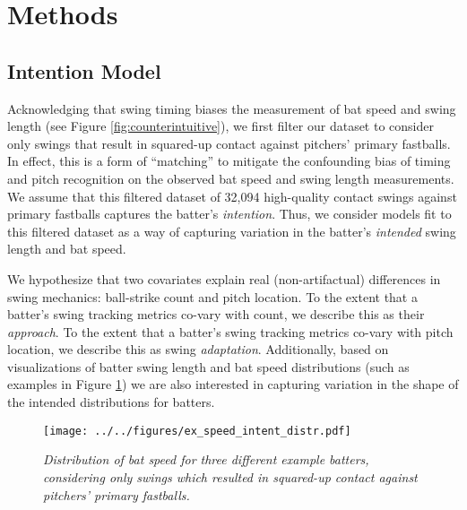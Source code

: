 \documentclass[
  12pt]{article}
\begin{document}
  \section{Methods}
  \label{sec:methods}

    \subsection{Intention Model}
    \label{sec:methods-intention}

    Acknowledging that swing timing biases the measurement of bat speed and swing length (see Figure \ref{fig:counterintuitive}), we first filter our dataset to consider only swings that result in squared-up contact against pitchers' primary fastballs. In effect, this is a form of ``matching'' to mitigate the confounding bias of timing and pitch recognition on the observed bat speed and swing length measurements. We assume that this filtered dataset of 32,094 high-quality contact swings against primary fastballs captures the batter's \textit{intention}. Thus, we consider models fit to this filtered dataset as a way of capturing variation in the batter's \textit{intended} swing length and bat speed.

    We hypothesize that two covariates explain real (non-artifactual) differences in swing mechanics: ball-strike count and pitch location. To the extent that a batter's swing tracking metrics co-vary with count, we describe this as their \textit{approach}. To the extent that a batter's swing tracking metrics co-vary with pitch location, we describe this as swing \textit{adaptation}.  Additionally, based on visualizations of batter swing length and bat speed distributions (such as examples in Figure \ref{fig:ex-bat-speed}) we are also interested in capturing variation in the shape of the intended distributions for batters. 

    \begin{figure}[H]
      \centering
      \texttt{[image: ../../figures/ex\_speed\_intent\_distr.pdf]}
      \caption{\it Distribution of bat speed for three different example batters, considering only swings which resulted in squared-up contact against pitchers' primary fastballs.}
      \label{fig:ex-bat-speed}
    \end{figure}
\end{document}
